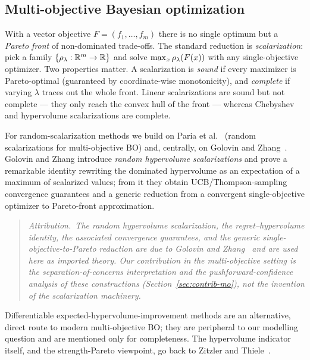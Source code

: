 \subsection{Multi-objective Bayesian optimization}
\label{sec:bg-mo}

With a vector objective $F=(f_1,\dots,f_m)$ there is no single optimum but a
\emph{Pareto front} of non-dominated trade-offs. The standard reduction is
\emph{scalarization}: pick a family $\{\rho_\lambda:\mathbb{R}^m\to\mathbb{R}\}$ and solve
$\max_x\rho_\lambda(F(x))$ with any single-objective optimizer. Two properties
matter. A scalarization is \emph{sound} if every maximizer is Pareto-optimal
(guaranteed by coordinate-wise monotonicity), and \emph{complete} if varying
$\lambda$ traces out the whole front. Linear scalarizations are sound but not
complete --- they only reach the convex hull of the front --- whereas
Chebyshev and hypervolume scalarizations are complete. \hfill\Plit

For random-scalarization methods we build on Paria et al.~\cite{paria2019}
(random scalarizations for multi-objective BO) and, centrally, on Golovin and
Zhang~\cite{golovin2020}. Golovin and Zhang introduce \emph{random hypervolume
scalarizations} and prove a remarkable identity rewriting the dominated
hypervolume as an expectation of a maximum of scalarized values; from it they
obtain UCB/Thompson-sampling convergence guarantees and a generic reduction from
a convergent single-objective optimizer to Pareto-front approximation.
\hfill\Plit

\begin{quote}
\itshape Attribution.\ The random hypervolume scalarization, the
regret--hypervolume identity, the associated convergence guarantees, and the
generic single-objective-to-Pareto reduction are due to Golovin and
Zhang~\cite{golovin2020} and are used here as imported theory. Our contribution
in the multi-objective setting is the separation-of-concerns interpretation and
the pushforward-confidence analysis of these constructions
(Section~\ref{sec:contrib-mo}), not the invention of the scalarization machinery.
\end{quote}

Differentiable expected-hypervolume-improvement methods
\cite{daulton2020} are an alternative, direct route to modern multi-objective
BO; they are peripheral to our modelling question and are mentioned only for
completeness. The hypervolume indicator itself, and the strength-Pareto
viewpoint, go back to Zitzler and Thiele~\cite{zitzler1999}. \hfill\Plit

